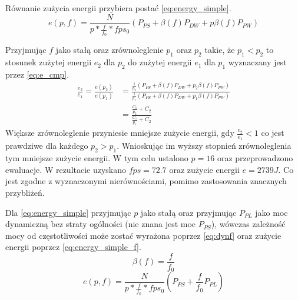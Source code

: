 Równanie zużycia energii przybiera postać \eqref{eq:energy_simple}.
\begin{equation}
e(p,f) = \frac{N}{p*\frac{f}{f_0}* fps_0}(P_{PS} + \beta (f) P_{DW} + p \beta (f) P_{PW})
\label{eq:energy_simple}
\end{equation}

Przyjmując $f$ jako stałą oraz zrównoleglenie $p_1$ oraz $p_2$ takie, że $p_1 < p_2$ 
to stosunek zużytej energii $e_2$ dla  $p_2$ do zużytej energii $e_1$ dla  $p_1$ wyznaczany jest przez \eqref{eq:e_cmp}.
\begin{equation}
\begin{aligned}
\frac{e_2}{e_1} = \frac{e(p_2)}{e(p_1)} &= \frac
{\frac{1}{p_2}(P_{PS} + \beta(f) P_{DW} + p_2 \beta(f) P_{PW})}
{\frac{1}{p_1}(P_{PS} + \beta(f) P_{DW} + p_1 \beta(f) P_{PW})}\\
&= \frac
{\frac{C_1}{p_2} + C_2}
{\frac{C_1}{p_1} + C_2}
\end{aligned}
\label{eq:e_cmp}
\end{equation}
 Większe zrównoleglenie przyniesie mniejsze zużycie energii, gdy $\frac{e_2}{e_1} < 1$ co jest prawdziwe dla każdego $p_2 > p_1$. 
 Wnioskując im wyższy stopnień zrównoleglenia tym mniejsze zużycie energii.
 W tym celu ustalono $p = 16$ oraz przeprowadzono ewaluacje.
 W rezultacie uzyskano $fps = 72.7$ oraz zużycie energii $e = 2739 J$.
 Co jest zgodne z wyznaczonymi nierównościami, pomimo zastosowania znacznych przybliżeń.
 
 Dla \eqref{eq:energy_simple} przyjmując $p$ jako stałą oraz przyjmując $P_{PL}$ jako moc dynamiczną bez straty ogólności (nie znana jest moc $P_{PS}$), wówczas zależność mocy od częstotliwości może zostać wyrażona poprzez \eqref{eq:dynf} \cite{dynamic_power} oraz zużycie energii poprzez \eqref{eq:energy_simple_f}. 
\begin{equation}
\beta(f) = \frac{f}{f_0}
\label{eq:dynf}
\end{equation} 
\begin{equation}
e(p,f) = \frac{N}{p*\frac{f}{f_0}* fps_0}(P_{PS} + \frac{f}{f_0} P_{PL})
\label{eq:energy_simple_f}
\end{equation}

